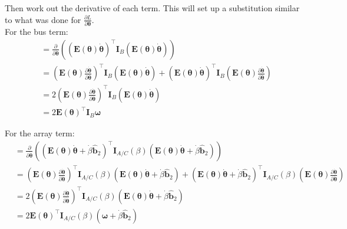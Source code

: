 \documentclass[titlepage]{article}
\begin{document}
Then work out the derivative of each term. This will set up a substitution similar to what was done for $\frac{\partial L}{\partial\boldsymbol{\theta}}$.\\

For the bus term:
\begin{equation}
	\begin{split}
		&=\frac{\partial}{\partial\dot{\boldsymbol{\theta}}}\left(\left(\boldsymbol{E}(\boldsymbol{\theta})\dot{\boldsymbol{\theta}}\right)^\top\boldsymbol{I}_B\left(\boldsymbol{E}(\boldsymbol{\theta})\dot{\boldsymbol{\theta}}\right)\right) \\
		&=\left(\boldsymbol{E}(\boldsymbol{\theta})\frac{\partial\dot{\boldsymbol{\theta}}}{\partial\dot{\boldsymbol{\theta}}}\right)^\top\boldsymbol{I}_B\left(\boldsymbol{E}(\boldsymbol{\theta})\dot{\boldsymbol{\theta}}\right)+\left(\boldsymbol{E}(\boldsymbol{\theta})\dot{\boldsymbol{\theta}}\right)^\top\boldsymbol{I}_B\left(\boldsymbol{E}(\boldsymbol{\theta})\frac{\partial\dot{\boldsymbol{\theta}}}{\partial\dot{\boldsymbol{\theta}}}\right) \\
		&=2\left(\boldsymbol{E}(\boldsymbol{\theta})\frac{\partial\dot{\boldsymbol{\theta}}}{\partial\dot{\boldsymbol{\theta}}}\right)^\top\boldsymbol{I}_B\left(\boldsymbol{E}(\boldsymbol{\theta})\dot{\boldsymbol{\theta}}\right) \\
		&=2\boldsymbol{E}(\boldsymbol{\theta})^\top\boldsymbol{I}_B\boldsymbol{\omega}
	\end{split}
\end{equation}

For the array term:
\begin{equation}
	\begin{split}
		&=\frac{\partial}{\partial\dot{\boldsymbol{\theta}}}\left(\left(\boldsymbol{E}(\boldsymbol{\theta})\dot{\boldsymbol{\theta}}+\dot{\beta}\hat{\boldsymbol{b}}_2\right)^\top\boldsymbol{I}_{A/C}(\beta)\left(\boldsymbol{E}(\boldsymbol{\theta})\dot{\boldsymbol{\theta}}+\dot{\beta}\hat{\boldsymbol{b}}_2\right)\right) \\
		&=\left(\boldsymbol{E}(\boldsymbol{\theta})\frac{\partial\dot{\boldsymbol{\theta}}}{\partial\dot{\boldsymbol{\theta}}}\right)^\top\boldsymbol{I}_{A/C}(\beta)\left(\boldsymbol{E}(\boldsymbol{\theta})\dot{\boldsymbol{\theta}}+\dot{\beta}\hat{\boldsymbol{b}}_2\right)+\left(\boldsymbol{E}(\boldsymbol{\theta})\dot{\boldsymbol{\theta}}+\dot{\beta}\hat{\boldsymbol{b}}_2\right)^\top\boldsymbol{I}_{A/C}(\beta)\left(\boldsymbol{E}(\boldsymbol{\theta})\frac{\partial\dot{\boldsymbol{\theta}}}{\partial\dot{\boldsymbol{\theta}}}\right) \\
		&=2\left(\boldsymbol{E}(\boldsymbol{\theta})\frac{\partial\dot{\boldsymbol{\theta}}}{\partial\dot{\boldsymbol{\theta}}}\right)^\top\boldsymbol{I}_{A/C}(\beta)\left(\boldsymbol{E}(\boldsymbol{\theta})\dot{\boldsymbol{\theta}}+\dot{\beta}\hat{\boldsymbol{b}}_2\right) \\
		&=2\boldsymbol{E}(\boldsymbol{\theta})^\top\boldsymbol{I}_{A/C}(\beta)\left(\boldsymbol{\omega}+\dot{\beta}\hat{\boldsymbol{b}}_2\right)
	\end{split}
\end{equation}
\end{document}
